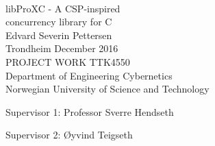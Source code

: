 
\thispagestyle{empty}
\mbox{}\\[6pc]
\begin{center}
\Huge{libProXC - A CSP-inspired\\ concurrency library for C}\\[2pc]

\Large{Edvard Severin Pettersen}\\[1pc]
\large{Trondheim December 2016}\\[2pc]

PROJECT WORK TTK4550\\
Department of Engineering Cybernetics\\
Norwegian University of Science and Technology
\end{center}
\vfill

\noindent Supervisor 1: Professor Sverre Hendseth

\noindent Supervisor 2: Øyvind Teigseth

